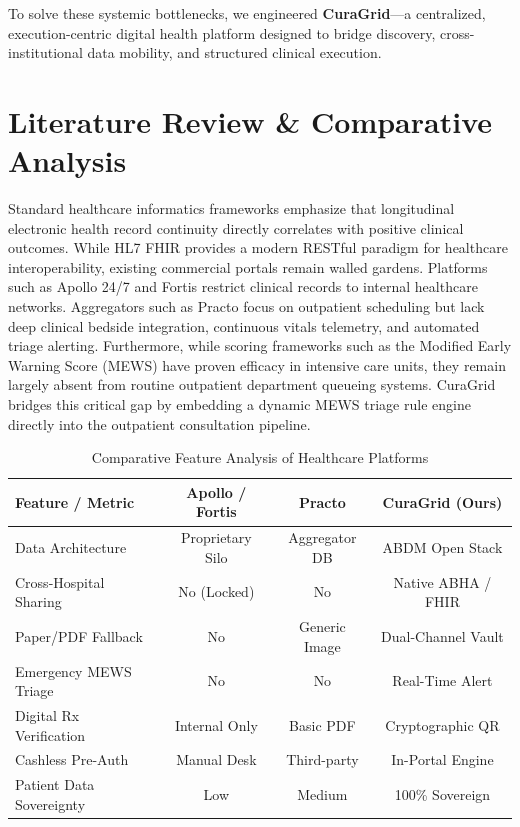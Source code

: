 \documentclass[conference]{IEEEtran}
\begin{document}
To solve these systemic bottlenecks, we engineered \textbf{CuraGrid}---a centralized, execution-centric digital health platform designed to bridge discovery, cross-institutional data mobility, and structured clinical execution.

\section{Literature Review \& Comparative Analysis}
Standard healthcare informatics frameworks emphasize that longitudinal electronic health record continuity directly correlates with positive clinical outcomes. While HL7 FHIR provides a modern RESTful paradigm for healthcare interoperability, existing commercial portals remain walled gardens. Platforms such as Apollo 24/7 and Fortis restrict clinical records to internal healthcare networks. Aggregators such as Practo focus on outpatient scheduling but lack deep clinical bedside integration, continuous vitals telemetry, and automated triage alerting. Furthermore, while scoring frameworks such as the Modified Early Warning Score (MEWS) have proven efficacy in intensive care units, they remain largely absent from routine outpatient department queueing systems. CuraGrid bridges this critical gap by embedding a dynamic MEWS triage rule engine directly into the outpatient consultation pipeline.

\begin{table}[htbp]
\caption{Comparative Feature Analysis of Healthcare Platforms}
\begin{center}
\begin{tabular}{|l|c|c|c|}
\hline
\textbf{Feature / Metric} & \textbf{Apollo / Fortis} & \textbf{Practo} & \textbf{CuraGrid (Ours)} \\
\hline
Data Architecture & Proprietary Silo & Aggregator DB & ABDM Open Stack \\
Cross-Hospital Sharing & No (Locked) & No & Native ABHA / FHIR \\
Paper/PDF Fallback & No & Generic Image & Dual-Channel Vault \\
Emergency MEWS Triage & No & No & Real-Time Alert \\
Digital Rx Verification & Internal Only & Basic PDF & Cryptographic QR \\
Cashless Pre-Auth & Manual Desk & Third-party & In-Portal Engine \\
Patient Data Sovereignty & Low & Medium & 100\% Sovereign \\
\hline
\end{tabular}
\label{tab:comparative}
\end{center}
\end{table}
\end{document}
